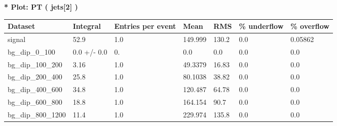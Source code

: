\documentclass[a4paper, 10pt]{article}
\begin{document}
\textbf{* Plot: PT ( jets[2] ) }\\
   \begin{table}[H]
  \begin{center}
    \begin{tabular}{|m{23.0mm}|m{23.0mm}|m{18.0mm}|m{19.0mm}|m{19.0mm}|m{19.0mm}|m{19.0mm}|}
      \hline
      {\cellcolor{yellow}         Dataset}& {\cellcolor{yellow}         Integral}& {\cellcolor{yellow}         Entries per event}& {\cellcolor{yellow}         Mean}& {\cellcolor{yellow}         RMS}& {\cellcolor{yellow}         \% underflow}& {\cellcolor{yellow}         \% overflow}\\
      \hline
      {\cellcolor{white}         signal}& {\cellcolor{white}         52.9}& {\cellcolor{white}         1.0}& {\cellcolor{white}         149.999}& {\cellcolor{white}         130.2}& {\cellcolor{green}         0.0}& {\cellcolor{green}         0.05862}\\
      \hline
      {\cellcolor{white}         bg\_dip\_0\_100}& {\cellcolor{white}         0.0 +/\-- 0.0}& {\cellcolor{white}         0.}& {\cellcolor{white}         0.0}& {\cellcolor{white}         0.0}& {\cellcolor{green}         0.0}& {\cellcolor{green}         0.0}\\
      \hline
      {\cellcolor{white}         bg\_dip\_100\_200}& {\cellcolor{white}         3.16}& {\cellcolor{white}         1.0}& {\cellcolor{white}         49.3379}& {\cellcolor{white}         16.83}& {\cellcolor{green}         0.0}& {\cellcolor{green}         0.0}\\
      \hline
      {\cellcolor{white}         bg\_dip\_200\_400}& {\cellcolor{white}         25.8}& {\cellcolor{white}         1.0}& {\cellcolor{white}         80.1038}& {\cellcolor{white}         38.82}& {\cellcolor{green}         0.0}& {\cellcolor{green}         0.0}\\
      \hline
      {\cellcolor{white}         bg\_dip\_400\_600}& {\cellcolor{white}         34.8}& {\cellcolor{white}         1.0}& {\cellcolor{white}         120.487}& {\cellcolor{white}         64.78}& {\cellcolor{green}         0.0}& {\cellcolor{green}         0.0}\\
      \hline
      {\cellcolor{white}         bg\_dip\_600\_800}& {\cellcolor{white}         18.8}& {\cellcolor{white}         1.0}& {\cellcolor{white}         164.154}& {\cellcolor{white}         90.7}& {\cellcolor{green}         0.0}& {\cellcolor{green}         0.0}\\
      \hline
      {\cellcolor{white}         bg\_dip\_800\_1200}& {\cellcolor{white}         11.4}& {\cellcolor{white}         1.0}& {\cellcolor{white}         229.974}& {\cellcolor{white}         135.8}& {\cellcolor{green}         0.0}& {\cellcolor{green}         0.0}\\

\end{tabular}
\end{center}
\end{table}
\end{document}
